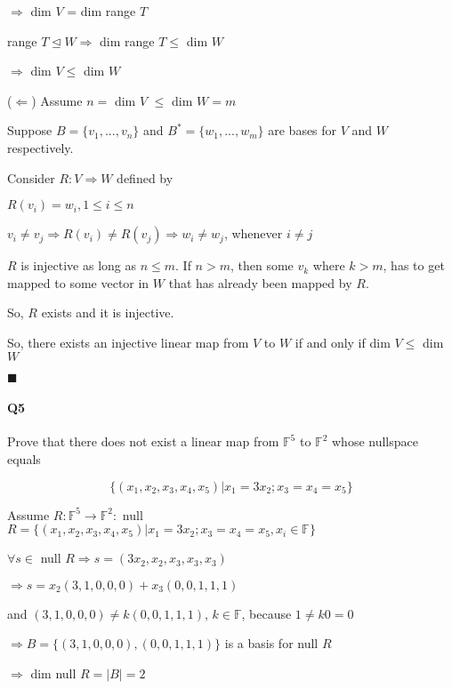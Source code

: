 \documentclass{article}
\begin{document}
$\Rightarrow$ dim $V$ = dim range $T$

range $T \trianglelefteq W \Rightarrow$ dim range $T \leq$ dim $W$

$\Rightarrow$ dim $V \leq$ dim $W$

($\Leftarrow$) Assume $n = $ dim $V$ $\leq$ dim $W = m$

Suppose $B = \{v_1, ... ,v_n\}$ and $B^* = \{w_1, ... ,w_m\}$ are bases
for $V$ and $W$ respectively.

Consider $R: V \Rightarrow W$ defined by

$R(v_i) = w_i, 1 \leq i \leq n$

$v_i \neq v_j \Rightarrow R(v_i) \neq R(v_j) \Rightarrow w_i \neq
w_j$, whenever $i \neq j$

$R$ is injective as long as $n \leq m$. If $n > m$, then some $v_k$
where $k > m$, has to get mapped to some vector in $W$ that has
already been mapped by $R$.

So, $R$ exists and it is injective.

So, there exists an injective linear map from $V$ to $W$ if and only
if dim $V \leq$ dim $W$
\vspace{0.618 em}

$\blacksquare$

\paragraph{Q5} Prove that there does not exist a linear map from
$\mathbb{F}^5$ to $\mathbb{F}^2$ whose nullspace equals

\begin{equation*}\{(x_1,x_2,x_3,x_4,x_5)|x_1=3x_2;x_3=x_4=x_5\}\end{equation*}

\vspace{0.618 em}

Assume $R: \mathbb{F}^5 \rightarrow \mathbb{F}^2:$ null $R =
\{(x_1,x_2,x_3,x_4,x_5)|x_1=3x_2;x_3=x_4=x_5, x_i \in \mathbb{F}\}$

$\forall s \in $ null $R
\Rightarrow s = (3x_2,x_2,x_3,x_3,x_3)$

$\Rightarrow s = x_2(3,1,0,0,0) + x_3(0,0,1,1,1)$

and $(3,1,0,0,0)
\neq k(0,0,1,1,1)$, $k \in \mathbb{F}$, because $1 \neq k0 = 0$

$\Rightarrow B = \{ (3,1,0,0,0), (0,0,1,1,1) \}$ is a basis for null $R$

$\Rightarrow$ dim null $R = |B| = 2$
\end{document}
